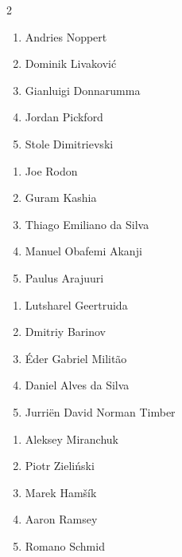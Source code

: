 \documentclass[11pt]{article}
\begin{document}
\begin{multicols}{2}

\begin{samepage}
\begin{tcolorbox}[evalbox,title=\textbf{Manuel Neuer (Goalkeeper)} \hfill Score:\ \rule{1cm}{0.4pt}]
\begin{enumerate}
\item Andries Noppert
\item Dominik Livaković
\item Gianluigi Donnarumma
\item Jordan Pickford
\item Stole Dimitrievski
\end{enumerate}
\end{tcolorbox}
\end{samepage}

\begin{samepage}
\begin{tcolorbox}[evalbox,title=\textbf{Virgil van Dijk (Left Center Back)} \hfill Score:\ \rule{1cm}{0.4pt}]
\begin{enumerate}
\item Joe Rodon
\item Guram Kashia
\item Thiago Emiliano da Silva
\item Manuel Obafemi Akanji
\item Paulus Arajuuri
\end{enumerate}
\end{tcolorbox}
\end{samepage}

\begin{samepage}
\begin{tcolorbox}[evalbox,title=\textbf{Trent Alexander-Arnold (Right Defensive Midfield)} \hfill Score:\ \rule{1cm}{0.4pt}]
\begin{enumerate}
\item Lutsharel Geertruida
\item Dmitriy Barinov
\item Éder Gabriel Militão
\item Daniel Alves da Silva
\item Jurriën David Norman Timber
\end{enumerate}
\end{tcolorbox}
\end{samepage}

\begin{samepage}
\begin{tcolorbox}[evalbox,title=\textbf{Kevin De Bruyne (Center Attacking Midfield)} \hfill Score:\ \rule{1cm}{0.4pt}]
\begin{enumerate}
\item Aleksey Miranchuk
\item Piotr Zieliński
\item Marek Hamšík
\item Aaron Ramsey
\item Romano Schmid
\end{enumerate}
\end{tcolorbox}
\end{samepage}


\end{multicols}
\end{document}
